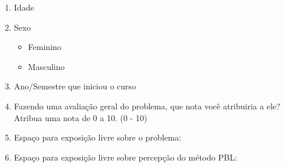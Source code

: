 \acresetall
\label{form-problema}
\begin{enumerate}
\item{Idade}
\item{Sexo}
\begin{itemize}
	\item{Feminino}
	\item{Masculino}
\end{itemize}
\item{Ano/Semestre que iniciou o curso}
\AfirmacaoLikert{\LikertPA{}}
\AfirmacaoLikert{\LikertPB{}}
\AfirmacaoLikert{\LikertPC{}}
\AfirmacaoLikert{\LikertPD{}}
\AfirmacaoLikert{\LikertPE{}}
\AfirmacaoLikert{\LikertPF{}}
\AfirmacaoLikert{\LikertPG{}}
\AfirmacaoLikert{\LikertPH{}}
\AfirmacaoLikert{\LikertPI{}}
\AfirmacaoLikert{\LikertPJ{}}
\AfirmacaoLikert{\LikertPK{}}
\AfirmacaoLikert{\LikertPL{}}
\AfirmacaoLikert{\LikertPM{}}
\AfirmacaoLikert{\LikertPN{}}
\AfirmacaoLikert{\LikertPO{}}
\AfirmacaoLikert{\LikertPP{}}
\AfirmacaoLikert{\LikertPQ{}}
\AfirmacaoLikert{\LikertPR{}}
\AfirmacaoLikert{\LikertPS{}}
\AfirmacaoLikert{\LikertPT{}}
\AfirmacaoLikert{\LikertPU{}}
\AfirmacaoLikert{\LikertPV{}}
\AfirmacaoLikert{\LikertPW{}}
\AfirmacaoLikert{\LikertPX{}}
\item{Fazendo uma avaliação geral do problema, que nota você
atribuiria a ele? Atribua uma nota de 0 a 10. (0 - 10)}
\item{Espaço para exposição livre sobre o problema:}
\item{Espaço para exposição livre sobre percepção do método PBL:}
\end{enumerate}
